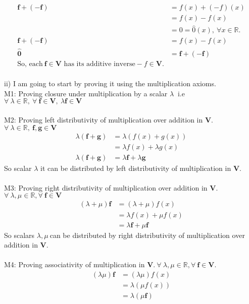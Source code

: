 \documentclass[10pt,a4paper]{article}
\numberwithin{equation}{section}
\begin{document}
\begin{align*}
	 \mathbf{f + (-f)} &= f(x)+(-f)(x) \\
	 &= f(x)- f(x) \\
	 &= 0 = \hat{0}(x),~ \forall x \in \mathbb{R}. \\
	\mathbf{f + (-f)} &= f(x)-f(x) \\
	\mathbf{\hat{0}} &= \mathbf{f + (-f)} \\
	\text{So, each}~\mathbf{f} \in \mathbf{V}\text{ has its additive inverse} -f \in \mathbf{V}.
\end{align*}
~\\
ii) I am going to start by proving it using the multiplication axioms.\\
M1: Proving closure under multiplication by a scalar $\lambda~$ i.e $\forall~ \lambda \in \mathbb{R},~\forall ~\mathbf{f} \in \mathbf{V},~ \lambda \mathbf{f} \in \mathbf{V}$ \\
~\\
M2: Proving left distributivity of multiplication
over addition in $\mathbf{V}$. $\forall ~\lambda \in \mathbb{R},~\mathbf{f,g} \in\mathbf{V}$ \\
\begin{align*}
\lambda(\mathbf{f+g}) &= \lambda(f(x)+g(x)) \\ 
&=\lambda f(x)+\lambda g(x) \\
\lambda(\mathbf{f+g}) &=\lambda\mathbf{f}+\lambda\mathbf{g}
\end{align*}
So scalar $\lambda$ it can be distributed by left distributivity of multiplication in $\mathbf{V}$. \\
~\\
M3: Proving right distributivity of multiplication over addition in $\mathbf{V}$. $\forall ~\lambda,\mu \in \mathbb{R},\forall~\mathbf{f} \in\mathbf{V}$
\begin{align*}
(\lambda+\mu)\mathbf{f} &=(\lambda+\mu)f(x) \\
&=\lambda f(x)+\mu f(x) \\
&= \lambda\mathbf{f} +\mu \mathbf{f} 
\end{align*}
So scalars $\lambda,\mu~$can be distributed by right distributivity of multiplication over addition in $\mathbf{V}$. \\
~\\
M4: Proving associativity of multiplication in $\mathbf{V}$.$~\forall ~\lambda,\mu \in \mathbb{R},\forall~\mathbf{f} \in\mathbf{V}$. \\
\begin{align*}
	(\lambda\mu)\mathbf{f} &=(\lambda\mu)f(x) \\
	&=\lambda(\mu f(x)) \\
	&= \lambda(\mu \mathbf{f})
\end{align*}
\end{document}
